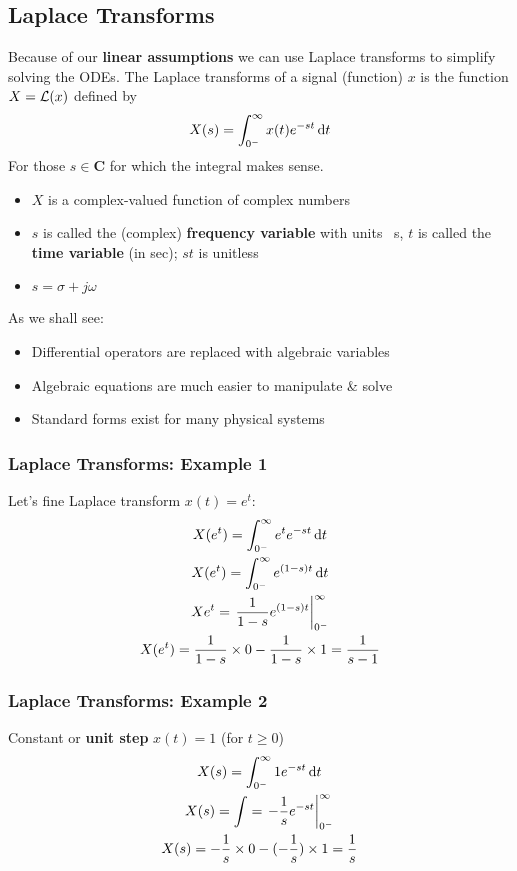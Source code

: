 \subsection{Laplace Transforms}
Because of our \textbf{linear assumptions} we can use Laplace transforms to simplify solving the ODEs. The Laplace transforms of a signal (function) $x$ is the function $X = \mathcal{L} (x)$ defined by
\begin{equation}
  X(s) = \int_{0^-}^\infty x(t) e^{-st} \dif t
\end{equation}
For those $s \in \textbf{C}$ for which the integral makes sense.
\begin{itemize}
  \item $X$ is a complex-valued function of complex numbers
  \item $s$ is called the (complex) \textbf{frequency variable} with units \si{\per\second}, $t$ is called the \textbf{time variable} (in sec); $st$ is unitless
  \item $s = \sigma + j \omega$
\end{itemize}
As we shall see:
\begin{itemize}
  \item Differential operators are replaced with algebraic variables
  \item Algebraic equations are much easier to manipulate \& solve
  \item Standard forms exist for many physical systems
\end{itemize}
\subsubsection{Laplace Transforms: Example 1}
Let's fine Laplace transform $x(t) = e^t$:
\begin{gather}
  X(e^t) = \int_{0^-}^\infty e^t e^{-st} \dif t\\
  X(e^t) = \int_{0^-}^\infty e^{(1-s)t} \dif t\\
  X{e^t} = \left. \frac{1}{1-s}e^{(1-s)t}\right|_{0^-}^\infty \\
  X(e^t) = \frac{1}{1-s} \times 0 - \frac{1}{1-s} \times 1 = \frac{1}{s-1}
\end{gather}
\subsubsection{Laplace Transforms: Example 2}
Constant or \textbf{unit step} $x(t) =1$ (for $t \geq 0$)
\begin{gather}
  X(s) = \int_{0^-}^{\infty} 1 e^{-st}\dif t\\
  X(s) = \int = \left. -\frac{1}{s} e^{-st} \right|_{0^-}^\infty\\
  X(s) = - \frac{1}{s} \times 0 - (- \frac{1}{s}) \times 1 = \frac{1}{s}
\end{gather}
